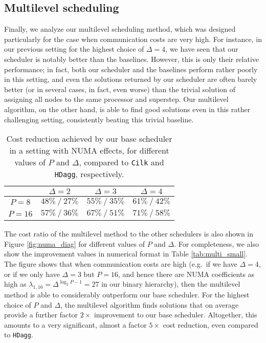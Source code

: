 \documentclass[sigconf,nonacm]{acmart}
\begin{document}
\subsection{Multilevel scheduling} Finally, we analyze our multilevel scheduling method, which was designed particularly for the case when communication costs are very high. For instance, in our previous setting for the highest choice of $\Delta \! = \! 4$, we have seen that our scheduler is notably better than the baselines. However, this is only their relative performance; in fact, both our scheduler and the baselines perform rather poorly in this setting, and even the solutions returned by our scheduler are often barely better (or in several cases, in fact, even worse) than the trivial solution of assigning all nodes to the same processor and superstep. Our multilevel algorithm, on the other hand, is able to find good solutions even in this rather challenging setting, consistently beating this trivial baseline.

\begin{table}[t]
\centering
\caption{Cost reduction achieved by our base scheduler in a setting with NUMA effects, for different values of $P$ and $\Delta$, compared to \texttt{Cilk} and \texttt{HDagg}, respectively.}
\renewcommand{\arraystretch}{1.65}
\begin{tabular}{c || c | c | c|}
  & $\Delta=2$ & $\Delta=3$ & $\Delta=4$ \\ [0.5ex] 
 \hline\hline
 $P=8$ & $48\% \: / \: 27\%$ & $55\% \: / \: 35\%$ & $61\% \: / \: 42\%$ \\
 \hline
 $P=16$ & $57\% \: / \: 36\%$ & $67\% \: / \: 51\%$ & $71\% \: / \: 58\%$ \\
 \hline
\end{tabular}
\label{tab:numa2}
\end{table}

The cost ratio of the multilevel method to the other schedulers is also shown in Figure \ref{fig:numa_diag} for different values of $P$ and $\Delta$. For completeness, we also show the improvement values in numerical format in Table \ref{tab:multi_small}. The figure shows that when communication costs are high (e.g.\ if we have $\Delta\!=\!4$, or if we only have $\Delta\!=\!3$ but $P\!=\!16$, and hence there are NUMA coefficients as high as $\lambda_{1, 16}\!=\!\Delta^{\log_{2\!}P-1}\!=\!27$ in our binary hierarchy), then the multilevel method is able to considerably outperform our base scheduler. For the highest choice of $P$ and $\Delta$, the multilevel algorithm finds solutions that on average provide a further factor $2\times$ improvement to our base scheduler. Altogether, this amounts to a very significant, almost a factor $5 \times$ cost reduction, even compared to \texttt{HDagg}.
\end{document}
